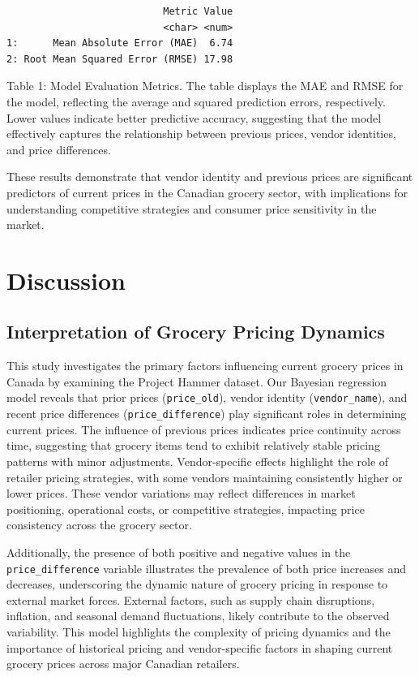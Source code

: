 \documentclass[
  letterpaper,
  DIV=11,
  numbers=noendperiod]{scrartcl}
\begin{document}
\begin{verbatim}
                           Metric Value
                           <char> <num>
1:      Mean Absolute Error (MAE)  6.74
2: Root Mean Squared Error (RMSE) 17.98
\end{verbatim}

Table 1: Model Evaluation Metrics. The table displays the MAE and RMSE
for the model, reflecting the average and squared prediction errors,
respectively. Lower values indicate better predictive accuracy,
suggesting that the model effectively captures the relationship between
previous prices, vendor identities, and price differences.

These results demonstrate that vendor identity and previous prices are
significant predictors of current prices in the Canadian grocery sector,
with implications for understanding competitive strategies and consumer
price sensitivity in the market.

\section{Discussion}\label{discussion}

\subsection{Interpretation of Grocery Pricing
Dynamics}\label{interpretation-of-grocery-pricing-dynamics}

This study investigates the primary factors influencing current grocery
prices in Canada by examining the Project Hammer dataset. Our Bayesian
regression model reveals that prior prices (\texttt{price\_old}), vendor
identity (\texttt{vendor\_name}), and recent price differences
(\texttt{price\_difference}) play significant roles in determining
current prices. The influence of previous prices indicates price
continuity across time, suggesting that grocery items tend to exhibit
relatively stable pricing patterns with minor adjustments.
Vendor-specific effects highlight the role of retailer pricing
strategies, with some vendors maintaining consistently higher or lower
prices. These vendor variations may reflect differences in market
positioning, operational costs, or competitive strategies, impacting
price consistency across the grocery sector.

Additionally, the presence of both positive and negative values in the
\texttt{price\_difference} variable illustrates the prevalence of both
price increases and decreases, underscoring the dynamic nature of
grocery pricing in response to external market forces. External factors,
such as supply chain disruptions, inflation, and seasonal demand
fluctuations, likely contribute to the observed variability. This model
highlights the complexity of pricing dynamics and the importance of
historical pricing and vendor-specific factors in shaping current
grocery prices across major Canadian retailers.
\end{document}
